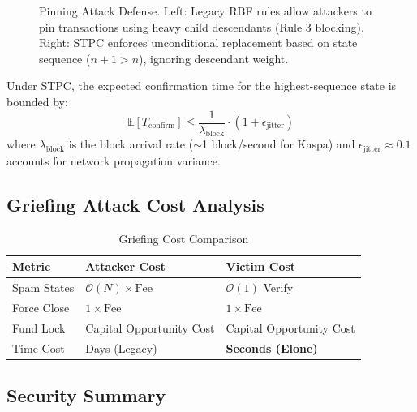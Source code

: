 \begin{figure}[htbp]
\caption{Pinning Attack Defense. Left: Legacy RBF rules allow attackers to pin transactions using heavy child descendants (Rule 3 blocking). Right: STPC enforces unconditional replacement based on state sequence ($n+1 > n$), ignoring descendant weight.}
\label{fig:pinning_defense}
\end{figure}

\begin{theorem}
Under STPC, the expected confirmation time for the highest-sequence state is bounded by:
$$ \mathbb{E}[T_{\mathrm{confirm}}] \le \frac{1}{\lambda_{\mathrm{block}}} \cdot (1 + \epsilon_{\mathrm{jitter}}) $$
where $\lambda_{\mathrm{block}}$ is the block arrival rate ($\sim$1 block/second for Kaspa) and $\epsilon_{\mathrm{jitter}} \approx 0.1$ accounts for network propagation variance.
\end{theorem}

\subsection{Griefing Attack Cost Analysis}

\begin{table}[htbp]
\centering
\caption{Griefing Cost Comparison}
\label{tab:griefing}
\small
\begin{tabularx}{\linewidth}{@{}l X X@{}}
\toprule
\textbf{Metric} & \textbf{Attacker Cost} & \textbf{Victim Cost} \\
\midrule
Spam States & $\mathcal{O}(N) \times \mathrm{Fee}$ & $\mathcal{O}(1)$ Verify \\
Force Close & $1 \times \mathrm{Fee}$ & $1 \times \mathrm{Fee}$ \\
Fund Lock & Capital Opportunity Cost & Capital Opportunity Cost \\
Time Cost & Days (Legacy) & \textbf{Seconds (Elone)} \\
\bottomrule
\end{tabularx}
\end{table}

\subsection{Security Summary}

